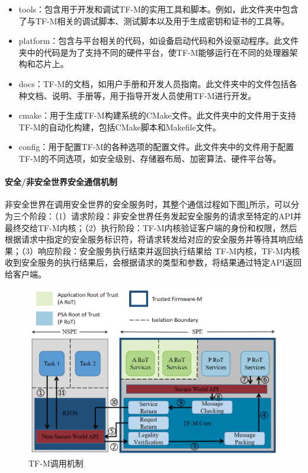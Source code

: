 \documentclass[12pt,a4paper]{ctexart}
\numberwithin{figure}{section}
\begin{document}
\begin{itemize}
    \item tools：包含用于开发和调试TF-M的实用工具和脚本。例如，此文件夹中包含了与TF-M相关的调试脚本、测试脚本以及用于生成密钥和证书的工具等。
    \item platform：包含与平台相关的代码，如设备启动代码和外设驱动程序。此文件夹中的代码是为了支持不同的硬件平台，使TF-M能够运行在不同的处理器架构和芯片上。
    \item docs：TF-M的文档，如用户手册和开发人员指南。此文件夹中的文件包括各种文档、说明、手册等，用于指导开发人员使用TF-M进行开发。
    \item cmake：用于生成TF-M构建系统的CMake文件。此文件夹中的文件用于支持TF-M的自动化构建，包括CMake脚本和Makefile文件。
    \item config：用于配置TF-M的各种选项的配置文件。此文件夹中的文件用于配置TF-M的不同选项，如安全级别、存储器布局、加密算法、硬件平台等。
\end{itemize}

\paragraph{安全/非安全世界安全通信机制}
非安全世界在调用安全世界的安全服务时，其整个通信过程如下图\ref{TF-M Secure communication processes}所示，可以分为三个阶段：（1）请求阶段：非安全世界任务发起安全服务的请求至特定的API并最终交给TF-M内核；（2）执行阶段：TF-M内核验证客户端的身份和权限，然后根据请求中指定的安全服务标识符，将请求转发给对应的安全服务并等待其响应结果；（3）响应阶段：安全服务执行结束并返回执行结果给 TF-M内核，TF-M内核收到安全服务的执行结果后，会根据请求的类型和参数，将结果通过特定API返回给客户端。
\begin{figure}
    \centering
    \includegraphics[scale=0.27]{graph/TF-M Secure communication processes.png}
    \caption{TF-M调用机制}
    \label{TF-M Secure communication processes}
\end{figure}
\end{document}
